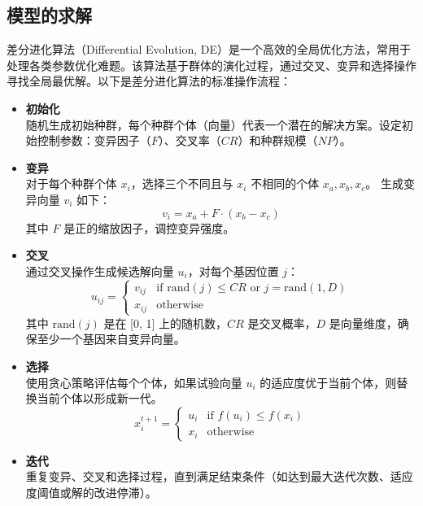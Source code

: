 \documentclass[withoutpreface,bwprint,12pt,a4paper]{cumcmthesis}
\begin{document}
\subsection{模型的求解}

差分进化算法（Differential Evolution, DE）是一个高效的全局优化方法，常用于处理各类参数优化难题。该算法基于群体的演化过程，通过交叉、变异和选择操作寻找全局最优解。以下是差分进化算法的标准操作流程：

\begin{itemize}
    \item \textbf{初始化}\\
    随机生成初始种群，每个种群个体（向量）代表一个潜在的解决方案。设定初始控制参数：变异因子（\(F\)）、交叉率（\(CR\)）和种群规模（\(NP\)）。
    
    \item \textbf{变异}\\
    对于每个种群个体 \(x_i\)，选择三个不同且与 \(x_i\) 不相同的个体 \(x_a, x_b, x_c\)。
    生成变异向量 \(v_i\) 如下：
    \[
    v_i = x_a + F \cdot (x_b - x_c)
    \]
    其中 \(F\) 是正的缩放因子，调控变异强度。

    \item \textbf{交叉}\\
    通过交叉操作生成候选解向量 \(u_i\)，对每个基因位置 \(j\)：
    \[
    u_{ij} = 
    \begin{cases} 
    v_{ij} & \text{if } \text{rand}(j) \leq CR \text{ or } j = \text{rand}(1, D) \\
    x_{ij} & \text{otherwise}
    \end{cases}
    \]
    其中 \(\text{rand}(j)\) 是在 [0, 1] 上的随机数，\(CR\) 是交叉概率，\(D\) 是向量维度，确保至少一个基因来自变异向量。

    \item \textbf{选择}\\
    使用贪心策略评估每个个体，如果试验向量 \(u_i\) 的适应度优于当前个体，则替换当前个体以形成新一代。
    \[
    x_i^{t+1} = 
    \begin{cases} 
    u_i & \text{if } f(u_i) \leq f(x_i) \\
    x_i & \text{otherwise}
    \end{cases}
    \]

    \item \textbf{迭代}\\
    重复变异、交叉和选择过程，直到满足结束条件（如达到最大迭代次数、适应度阈值或解的改进停滞）。
\end{itemize}
\end{document}
